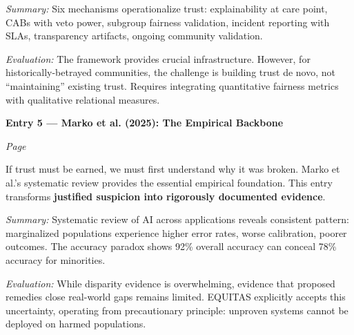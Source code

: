\documentclass[11pt,twoside]{article}
\begin{document}
\vspace{0.3cm}

\noindent \hspace{1cm} \textit{Summary:} Six mechanisms operationalize trust: explainability at care point, CABs with veto power, subgroup fairness validation, incident reporting with SLAs, transparency artifacts, ongoing community validation.

\vspace{0.1cm}

\noindent \hspace{1cm} \textit{Evaluation:} The framework provides crucial infrastructure. However, for historically-betrayed communities, the challenge is building trust de novo, not ``maintaining'' existing trust. Requires integrating quantitative fairness metrics with qualitative relational measures.

\vspace{0.5cm}

\noindent\textbf{\large Entry 5 --- Marko et al. (2025): The Empirical Backbone}\hfill

\textit{Page \pageref{entry5}}

\vspace{0.2cm}

\noindent If trust must be earned, we must first understand why it was broken. Marko et al.'s systematic review provides the essential empirical foundation. This entry transforms \textbf{justified suspicion into rigorously documented evidence}.

\vspace{0.3cm}

\noindent \hspace{1cm} \textit{Summary:} Systematic review of AI across applications reveals consistent pattern: marginalized populations experience higher error rates, worse calibration, poorer outcomes. The accuracy paradox shows 92\% overall accuracy can conceal 78\% accuracy for minorities.

\vspace{0.1cm}

\noindent \hspace{1cm} \textit{Evaluation:} While disparity evidence is overwhelming, evidence that proposed remedies close real-world gaps remains limited. EQUITAS explicitly accepts this uncertainty, operating from precautionary principle: unproven systems cannot be deployed on harmed populations.

\vspace{0.5cm}
\end{document}
